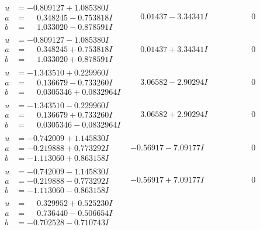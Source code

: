 \documentclass[1p]{elsarticle_modified}
\theoremstyle{definition}
\begin{document}
$$\begin{array}{c|c|c}
\begin{aligned}
u &= -0.809127 + 1.085380 I \\
a &= \phantom{-}0.348245 - 0.753818 I \\
b &= \phantom{-}1.033020 - 0.878591 I\end{aligned}
 & \phantom{-}0.01437 - 3.34341 I & \phantom{-0.000000 } 0 \\ \hline\begin{aligned}
u &= -0.809127 - 1.085380 I \\
a &= \phantom{-}0.348245 + 0.753818 I \\
b &= \phantom{-}1.033020 + 0.878591 I\end{aligned}
 & \phantom{-}0.01437 + 3.34341 I & \phantom{-0.000000 } 0 \\ \hline\begin{aligned}
u &= -1.343510 + 0.229960 I \\
a &= \phantom{-}0.136679 - 0.733260 I \\
b &= \phantom{-}0.0305346 + 0.0832964 I\end{aligned}
 & \phantom{-}3.06582 - 2.90294 I & \phantom{-0.000000 } 0 \\ \hline\begin{aligned}
u &= -1.343510 - 0.229960 I \\
a &= \phantom{-}0.136679 + 0.733260 I \\
b &= \phantom{-}0.0305346 - 0.0832964 I\end{aligned}
 & \phantom{-}3.06582 + 2.90294 I & \phantom{-0.000000 } 0 \\ \hline\begin{aligned}
u &= -0.742009 + 1.145830 I \\
a &= -0.219888 + 0.773292 I \\
b &= -1.113060 + 0.863158 I\end{aligned}
 & -0.56917 - 7.09177 I & \phantom{-0.000000 } 0 \\ \hline\begin{aligned}
u &= -0.742009 - 1.145830 I \\
a &= -0.219888 - 0.773292 I \\
b &= -1.113060 - 0.863158 I\end{aligned}
 & -0.56917 + 7.09177 I & \phantom{-0.000000 } 0 \\ \hline\begin{aligned}
u &= \phantom{-}0.329952 + 0.525230 I \\
a &= \phantom{-}0.736440 - 0.506654 I \\
b &= -0.702528 - 0.710743 I\end{aligned}

\end{array}$$
\end{document}
